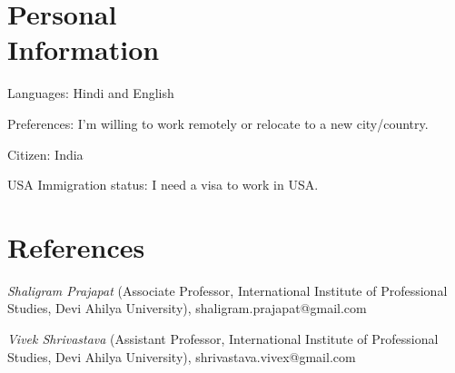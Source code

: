 \documentclass[margin,line]{resume}
\begin{document}
\begin{resume}
    \section{\mysidestyle Personal \\ Information}
    \begin{list2}
    \item Languages: Hindi and English
    \item Preferences: I'm willing to work remotely or relocate to a new city/country.
    \item Citizen: India
    \item USA Immigration status: I need a visa to work in USA.
    \end{list2}

    \section{\mysidestyle References} 

    \begin{list2}
    \item {\sl Shaligram Prajapat} (Associate Professor, International Institute of Professional Studies, Devi Ahilya University), shaligram.prajapat@gmail.com
	\item {\sl Vivek Shrivastava} (Assistant Professor, International Institute of Professional Studies, Devi Ahilya University), shrivastava.vivex@gmail.com
    \end{list2}

\end{resume}
\end{document}
